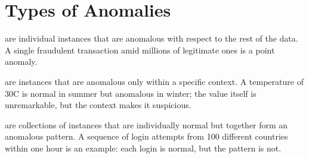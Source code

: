\newpage

\section{Types of Anomalies}


 are individual instances that are anomalous with respect to the rest of the data.
A single fraudulent transaction amid millions of legitimate ones is a point anomaly.

 are instances that are anomalous only within a specific context.
A temperature of 30\textdegree{}C is normal in summer but anomalous in winter; the value itself is unremarkable, but the context makes it suspicious.

 are collections of instances that are individually normal but together form an anomalous pattern.
A sequence of login attempts from 100 different countries within one hour is an example: each login is normal, but the pattern is not.

